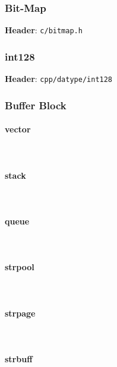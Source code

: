 

\subsubsection{Bit-Map}

\textbf{Header}: \verb|c/bitmap.h|





\subsubsection{int128}

\textbf{Header}: \verb|cpp/datype/int128|





\subsubsection{Buffer Block}



\paragraph{vector} \



\paragraph{stack} \



\paragraph{queue} \



\paragraph{strpool} \



\paragraph{strpage} \



\paragraph{strbuff} \

